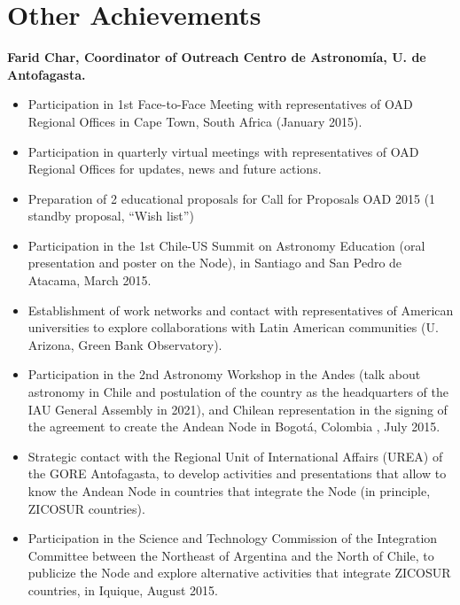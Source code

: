 \newpage
\section{Other Achievements}

\textbf{Farid Char,  Coordinator of Outreach Centro de Astronomía, U. de Antofagasta.}

\begin{itemize}
    \item Participation in 1st Face-to-Face Meeting with representatives of OAD Regional Offices in Cape Town, South Africa (January 2015).

    \item Participation in quarterly virtual meetings with representatives of OAD Regional Offices for updates, news and future actions.

    \item Preparation of 2 educational proposals for Call for Proposals OAD 2015 (1 standby proposal, “Wish list”)

    \item Participation in the 1st Chile-US Summit on Astronomy Education (oral presentation and poster on the Node), in Santiago and San Pedro de Atacama, March 2015.

    \item Establishment of work networks and contact with representatives of American universities to explore collaborations with Latin American communities (U. Arizona, Green Bank Observatory).

    \item Participation in the 2nd Astronomy Workshop in the Andes (talk about astronomy in Chile and postulation of the country as the headquarters of the IAU General Assembly in 2021), and Chilean representation in the signing of the agreement to create the Andean Node in Bogotá, Colombia , July 2015.

    \item Strategic contact with the Regional Unit of International Affairs (UREA) of the GORE Antofagasta, to develop activities and presentations that allow to know the Andean Node in countries that integrate the Node (in principle, ZICOSUR countries).

    \item Participation in the Science and Technology Commission of the Integration Committee between the Northeast of Argentina and the North of Chile, to publicize the Node and explore alternative activities that integrate ZICOSUR countries, in Iquique, August 2015.


\end{itemize}
